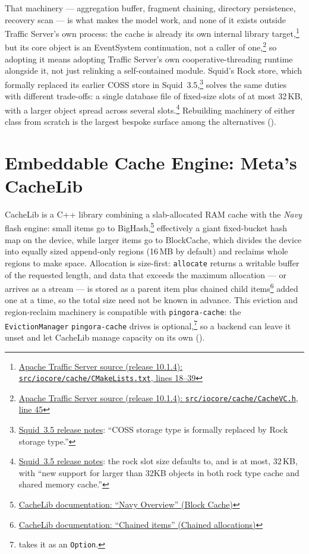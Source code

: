 That machinery --- aggregation buffer, fragment chaining, directory
persistence, recovery scan --- is what makes the model work, and none of
it exists outside Traffic Server's own process: the cache is already its
own internal library
target,\footnote{\href{https://github.com/apache/trafficserver/blob/10.1.4/src/iocore/cache/CMakeLists.txt\#L18-L39}{Apache
Traffic Server source (release 10.1.4): \texttt{src/iocore/cache/CMakeLists.txt}, lines 18--39}}
but its core object is an EventSystem continuation, not a caller of
one,\footnote{\href{https://github.com/apache/trafficserver/blob/10.1.4/src/iocore/cache/CacheVC.h\#L45}{Apache
Traffic Server source (release 10.1.4): \texttt{src/iocore/cache/CacheVC.h}, line 45}}
so adopting it means adopting Traffic Server's own cooperative-threading
runtime alongside it, not just relinking a self-contained module.
Squid's Rock store, which formally replaced its earlier COSS store in
Squid~3.5,\footnote{\href{https://www.squid-cache.org/Versions/v3/3.5/RELEASENOTES.html}{Squid~3.5
release notes}: ``COSS storage type is formally replaced by Rock storage
type.''} solves the same duties with different trade-offs: a single
database file of fixed-size slots of at most 32\,KB, with a larger object
spread across several slots.\footnote{\href{https://www.squid-cache.org/Versions/v3/3.5/RELEASENOTES.html}{Squid~3.5
release notes}: the rock slot size defaults to, and is at most, 32\,KB, with
``new support for larger than 32KB objects in both rock type cache and
shared memory cache.''} Rebuilding machinery of either class from scratch is
the largest bespoke surface among the alternatives
().

\section{Embeddable Cache Engine: Meta's CacheLib}
\label{app:alt-cachelib}

CacheLib is a C++ library combining a slab-allocated RAM cache with the
\emph{Navy} flash engine: small items go to
BigHash,\footnote{\href{https://cachelib.org/docs/Cache_Library_Architecture_Guide/navy_overview/\#block-cache}{CacheLib documentation: ``Navy Overview'' (Block Cache)}}
effectively a giant fixed-bucket hash map on the device, while larger
items go to BlockCache, which divides the device into equally sized
append-only regions (16\,MB by default) and reclaims whole regions to
make space. Allocation is size-first: \texttt{allocate} returns a
writable buffer of the requested length, and data that exceeds the
maximum allocation --- or arrives as a stream --- is stored as a parent
item plus chained child
items\footnote{\href{https://cachelib.org/docs/Cache_Library_User_Guides/chained_items/\#chained-allocations}{CacheLib documentation: ``Chained items'' (Chained allocations)}}
added one at a time, so the total size need not be known in advance.
This eviction and region-reclaim machinery is compatible with
\texttt{pingora-cache}: the \texttt{EvictionManager} \texttt{pingora-cache}
drives is optional,\footnote{
takes it as an \texttt{Option}.} so a backend can leave it unset and let
CacheLib manage capacity on its own ().

